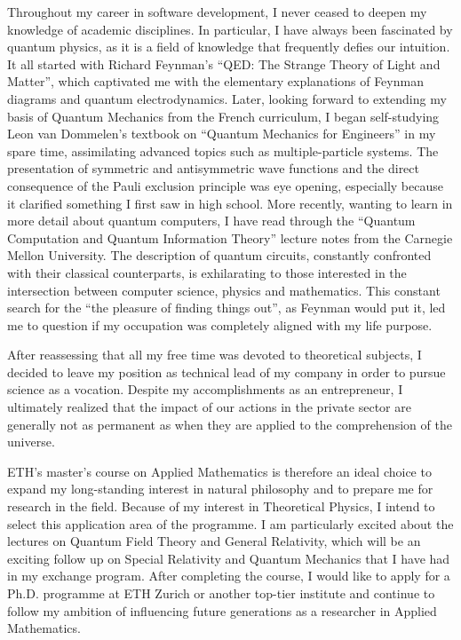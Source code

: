 \documentclass[11pt]{article}
\begin{document}
Throughout my career in software development, I never ceased to deepen my knowledge of academic disciplines. In particular, I have always been fascinated by quantum physics, as it is a field of knowledge that frequently defies our intuition. It all started with Richard Feynman's ``QED: The Strange Theory of Light and Matter'', which captivated me with the elementary explanations of Feynman diagrams and quantum electrodynamics. Later, looking forward to extending my basis of Quantum Mechanics from the French curriculum, I began self-studying Leon van Dommelen's textbook on ``Quantum Mechanics for Engineers'' in my spare time, assimilating advanced topics such as multiple-particle systems. The presentation of symmetric and antisymmetric wave functions and the direct consequence of the Pauli exclusion principle was eye opening, especially because it clarified something I first saw in high school. More recently, wanting to learn in more detail about quantum computers, I have read through the ``Quantum Computation and Quantum Information Theory'' lecture notes from the Carnegie Mellon University. The description of quantum circuits, constantly confronted with their classical counterparts, is exhilarating to those interested in the intersection between computer science, physics and mathematics. This constant search for the ``the pleasure of finding things out'', as Feynman would put it, led me to question if my occupation was completely aligned with my life purpose.

After reassessing that all my free time was devoted to theoretical subjects, I decided to leave my position as technical lead of my company in order to pursue science as a vocation. Despite my accomplishments as an entrepreneur, I ultimately realized that the impact of our actions in the private sector are generally not as permanent as when they are applied to the comprehension of the universe.

ETH's master's course on Applied Mathematics is therefore an ideal choice to expand my long-standing interest in natural philosophy and to prepare me for research in the field. Because of my interest in Theoretical Physics, I intend to select this application area of the programme. I am particularly excited about the lectures on Quantum Field Theory and General Relativity, which will be an exciting follow up on Special Relativity and Quantum Mechanics that I have had in my exchange program. After completing the course, I would like to apply for a Ph.D. programme at ETH Zurich or another top-tier institute and continue to follow my ambition of influencing future generations as a researcher in Applied Mathematics.

\end{document}
